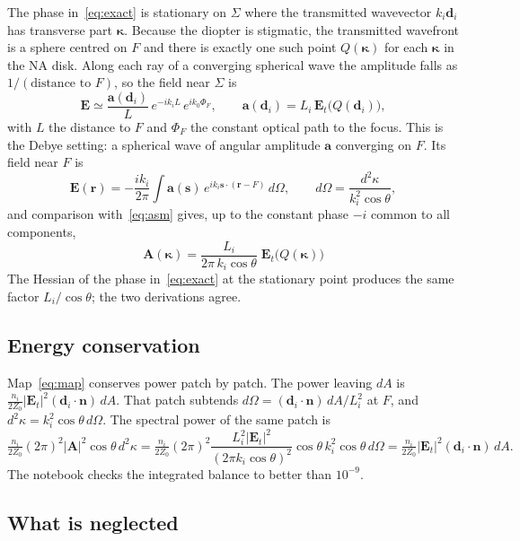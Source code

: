 \documentclass[11pt,a4paper]{article}
\newcommand{\ve}[1]{\bm{#1}}
\begin{document}
The phase in~\eqref{eq:exact} is stationary on $\Sigma$ where the transmitted
wavevector $k_i\ve d_i$ has transverse part $\boldsymbol\kappa$. Because the
diopter is stigmatic, the transmitted wavefront is a sphere centred on $F$ and
there is exactly one such point $Q(\boldsymbol\kappa)$ for each $\boldsymbol\kappa$
in the NA disk. Along each ray of a converging spherical wave the amplitude falls
as $1/(\text{distance to }F)$, so the field near $\Sigma$ is
\begin{equation}
 \ve E\simeq \frac{\ve a(\ve d_i)}{L}\,e^{-ik_iL}\,e^{ik_0\Phi_F},
 \qquad \ve a(\ve d_i)=L_i\,\ve E_t\bigl(Q(\ve d_i)\bigr),
 \label{eq:sphere}
\end{equation}
with $L$ the distance to $F$ and $\Phi_F$ the constant optical path to the
focus. This is the Debye setting: a spherical wave of angular amplitude $\ve a$
converging on $F$. Its field near $F$ is
\begin{equation}
 \ve E(\ve r)=-\frac{ik_i}{2\pi}\int\ve a(\ve s)\,e^{ik_i\ve s\cdot(\ve r-F)}\,d\Omega ,
 \qquad d\Omega=\frac{d^2\kappa}{k_i^2\cos\theta},
\end{equation}
and comparison with~\eqref{eq:asm} gives, up to the constant phase $-i$ common to
all components,
\begin{equation}
 \boxed{\;\ve A(\boldsymbol\kappa)=
 \frac{L_i}{2\pi\,k_i\cos\theta}\;\ve E_t\bigl(Q(\boldsymbol\kappa)\bigr)\;}
 \label{eq:map}
\end{equation}
The Hessian of the phase in~\eqref{eq:exact} at the stationary point produces the
same factor $L_i/\cos\theta$; the two derivations agree.

\subsection{Energy conservation}

Map~\eqref{eq:map} conserves power patch by patch. The power leaving
$dA$ is $\tfrac{n_i}{2Z_0}|\ve E_t|^2(\ve d_i\cdot\ve n)\,dA$. That patch
subtends $d\Omega=(\ve d_i\cdot\ve n)\,dA/L_i^2$ at $F$, and
$d^2\kappa=k_i^2\cos\theta\,d\Omega$. The spectral power of the same patch is
\[
 \tfrac{n_i}{2Z_0}(2\pi)^2|\ve A|^2\cos\theta\,d^2\kappa
 =\tfrac{n_i}{2Z_0}(2\pi)^2\frac{L_i^2|\ve E_t|^2}{(2\pi k_i\cos\theta)^2}
   \cos\theta\,k_i^2\cos\theta\,d\Omega
 =\tfrac{n_i}{2Z_0}|\ve E_t|^2(\ve d_i\cdot\ve n)\,dA .
\]
The notebook checks the integrated balance to better than $10^{-9}$.

\subsection{What is neglected}
\end{document}
